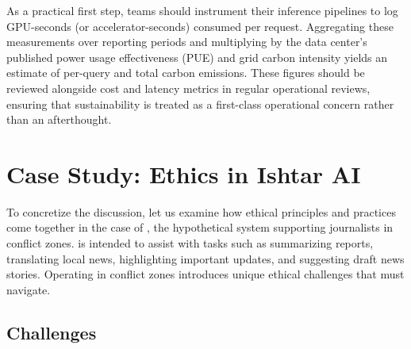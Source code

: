 As a practical first step, teams should instrument their inference pipelines to log GPU-seconds (or accelerator-seconds)
consumed per request. Aggregating these measurements over reporting periods and multiplying by the data center's published
power usage effectiveness (PUE) and grid carbon intensity yields an estimate of per-query and total carbon emissions.
These figures should be reviewed alongside cost and latency metrics in regular operational reviews, ensuring that
sustainability is treated as a first-class operational concern rather than an afterthought.


\section{Case Study: Ethics in Ishtar AI}\label{sec:ethics-ishtar}

To concretize the discussion, let us examine how ethical principles and practices come together in the case of \ishtar{}, the hypothetical system supporting journalists in conflict zones. \ishtar{} is intended to assist with tasks such as summarizing reports, translating local news, highlighting important updates, and suggesting draft news stories. Operating in conflict zones introduces unique ethical challenges that \ishtar{} must navigate.

\subsection{Challenges}

